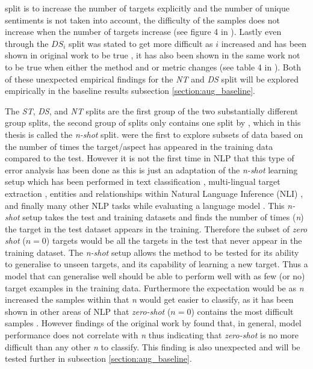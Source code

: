 split is to increase the number of targets explicitly and the number of unique sentiments is not taken into account, the difficulty of the samples does not increase when the number of targets increase (see figure 4 in \citet{aug_zhang2019aspectbased}).  Lastly even through the $DS_i$ split was stated to get more difficult as $i$ increased and has been shown in original work to be true \citep{aug_wang-etal-2017-tdparse}, it has also been shown in the same work not to be true when either the method and or metric changes (see table 4 in \citet{aug_wang-etal-2017-tdparse}). Both of these unexpected empirical findings for the \textit{NT} and \textit{DS} split will be explored empirically in the baseline results subsection \ref{section:aug_baseline}.

The \textit{ST}, \textit{DS}, and \textit{NT} splits are the first group of the two substantially different group splits, the second group of splits only contains one split by \citet{aug_yang2018multi}, which in this thesis is called the \textit{n-shot} split. \citet{aug_yang2018multi} were the first to explore subsets of data based on the number of times the target/aspect has appeared in the training data compared to the test. However it is not the first time in NLP that this type of error analysis has been done as this is just an adaptation of the \textit{n-shot} learning setup which has been performed in text classification \citep{aug_yu-etal-2018-diverse}, multi-lingual target extraction \citep{aug_jebbara-cimiano-2019-zero}, entities and relationships within Natural Language Inference (NLI) \citep{aug_levy-etal-2017-zero}, and finally many other NLP tasks while evaluating a language model \citep{aug_radford2019language}. This \textit{n-shot} setup takes the test and training datasets and finds the number of times (\textit{n}) the target in the test dataset appears in the training. Therefore the subset of \textit{zero shot} ($n=0$) targets would be all the targets in the test that never appear in the training dataset. The \textit{n-shot} setup allows the method to be tested for its ability to generalise to unseen targets, and its capability of learning a new target. Thus a model that can generalise well should be able to perform well with as few (or no) target examples in the training data. Furthermore the expectation would be as \textit{n} increased the samples within that \textit{n} would get easier to classify, as it has been shown in other areas of NLP that \textit{zero-shot} ($n=0$) contains the most difficult samples \citep{aug_jebbara-cimiano-2019-zero}. However findings of the original work by \citet{aug_yang2018multi} found that, in general, model performance does not correlate with \textit{n} thus indicating that \textit{zero-shot} is no more difficult than any other \textit{n} to classify. This finding is also unexpected and will be tested further in subsection \ref{section:aug_baseline}.

